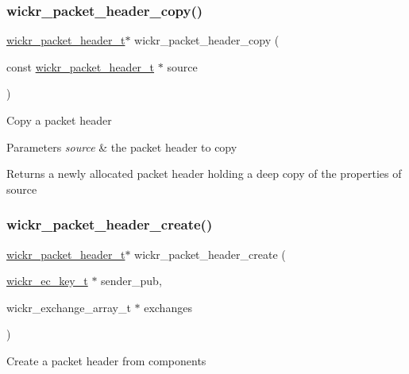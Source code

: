 \subsubsection{\texorpdfstring{wickr\+\_\+packet\+\_\+header\+\_\+copy()}{wickr\_packet\_header\_copy()}}
{\footnotesize\ttfamily \hyperlink{structwickr__packet__header}{wickr\+\_\+packet\+\_\+header\+\_\+t}$\ast$ wickr\+\_\+packet\+\_\+header\+\_\+copy (\begin{DoxyParamCaption}\item[{const \hyperlink{structwickr__packet__header}{wickr\+\_\+packet\+\_\+header\+\_\+t} $\ast$}]{source }\end{DoxyParamCaption})}

Copy a packet header


\begin{DoxyParams}{Parameters}
{\em source} & the packet header to copy \\
\hline
\end{DoxyParams}
\begin{DoxyReturn}{Returns}
a newly allocated packet header holding a deep copy of the properties of \textquotesingle{}source\textquotesingle{} 
\end{DoxyReturn}
\mbox{\label{group__wickr__protocol_ga8ad519d1b5dc3960c426db9a556404e1}} 
\subsubsection{\texorpdfstring{wickr\+\_\+packet\+\_\+header\+\_\+create()}{wickr\_packet\_header\_create()}}
{\footnotesize\ttfamily \hyperlink{structwickr__packet__header}{wickr\+\_\+packet\+\_\+header\+\_\+t}$\ast$ wickr\+\_\+packet\+\_\+header\+\_\+create (\begin{DoxyParamCaption}\item[{\hyperlink{structwickr__ec__key}{wickr\+\_\+ec\+\_\+key\+\_\+t} $\ast$}]{sender\+\_\+pub,  }\item[{wickr\+\_\+exchange\+\_\+array\+\_\+t $\ast$}]{exchanges }\end{DoxyParamCaption})}

Create a packet header from components


